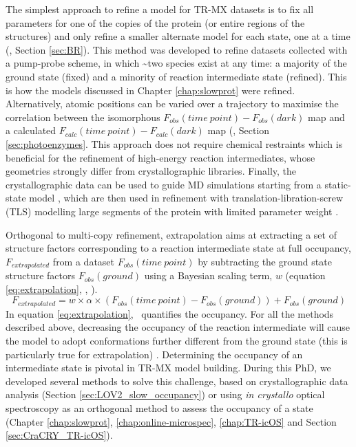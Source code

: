 The simplest approach to refine a model for TR-MX datasets is to fix all parameters for one of the copies of the protein (or entire regions of the structures) and only refine a smaller alternate model for each state, one at a time (\cite{nangoThreedimensionalMovieStructural2016}, Section \ref{sec:BR}). This method was developed to refine datasets collected with a pump-probe scheme, in which \textasciitilde two species exist at any time: a majority of the ground state (fixed) and a minority of reaction intermediate state (refined). This is how the models discussed in Chapter \ref{chap:slowprot} were refined. Alternatively, atomic positions can be varied over a trajectory to maximise the correlation between the isomorphous \(F_{obs}(time\ point) - F_{obs}(dark)\) map and a calculated \(F_{calc}(time\ point) - F_{calc}(dark)\) map (\cite{maestre-reynaSerialCrystallographyCaptures2022, maestre-reynaVisualizingDNARepair2023a}, Section \ref{sec:photoenzymes}. This approach does not require chemical restraints which is beneficial for the refinement of high-energy reaction intermediates, whose geometries strongly differ from crystallographic libraries. Finally, the crystallographic data can be used to guide MD simulations starting from a static-state model \parencite{grosInclusionThermalMotion1990,pearceMethodIntuitivelyExtracting2021}, which are then used in refinement with translation-libration-screw (TLS) modelling large segments of the protein with limited parameter weight \parencite{schroderSuperresolutionBiomolecularCrystallography2010,schroderDeformableElasticNetwork2014}.

Orthogonal to multi-copy refinement, extrapolation aims at extracting a set of structure factors corresponding to a reaction intermediate state at full occupancy, \(F_{extrapolated}\) from a dataset \(F_{obs}(time\ point)\) by subtracting the ground state structure factors \(F_{obs}(ground)\) using a Bayesian scaling term, \(w\) (equation \ref{eq:extrapolation}, \cite{genickStructureProteinPhotocycle1997}, \cite{dezitterXtrapol8EnablesAutomatic2022}). 
\begin{equation}\label{eq:extrapolation}
    F_{extrapolated} = w \times \alpha \times (F_{obs}(time\ point) - F_{obs}(ground)) + F_{obs}(ground)
\end{equation}
In equation \ref{eq:extrapolation}, \textalpha\ quantifies the occupancy. For all the methods described above, decreasing the occupancy of the reaction intermediate will cause the model to adopt conformations further different from the ground state (this is particularly true for extrapolation) \parencite{vallejosAppraisingProteinConformational2024}. Determining the occupancy of an intermediate state is pivotal in TR-MX model building. During this PhD, we developed several methods to solve this challenge, based on crystallographic data analysis (Section \ref{sec:LOV2_slow_occupancy}) or using \textit{in crystallo} optical spectroscopy as an orthogonal method to assess the occupancy of a state (Chapter \ref{chap:slowprot}, \ref{chap:online-microspec}, \ref{chap:TR-icOS} and Section \ref{sec:CraCRY_TR-icOS}).


